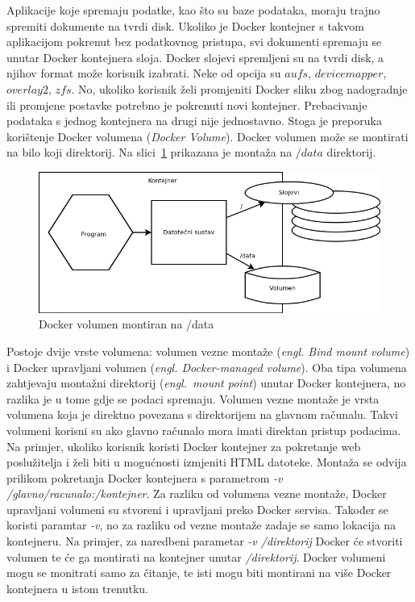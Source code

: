 Aplikacije koje spremaju podatke, kao što su baze podataka, moraju trajno spremiti dokumente na
tvrdi disk. Ukoliko je Docker kontejner s takvom aplikacijom pokrenut bez podatkovnog pristupa, svi
dokumenti spremaju se unutar Docker kontejnera sloja. Docker slojevi spremljeni su na tvrdi disk,
a njihov format može korisnik izabrati. Neke od opcija su $aufs$, $devicemapper$, $overlay2$, $zfs$.
No, ukoliko korisnik želi promjeniti Docker sliku zbog nadogradnje ili promjene postavke potrebno je
pokrenuti novi kontejner. Prebacivanje podataka s jednog kontejnera na drugi nije jednostavno. Stoga
je preporuka korištenje Docker volumena (\textit{Docker Volume}). Docker volumen može se montirati
na bilo koji direktorij. Na slici~\ref{fig:02docker_volume} prikazana je montaža na $/data$
direktorij.

\begin{figure}[h]
    \centering
    \includegraphics[width=\textwidth]{img/02/docker_volume.png}
    \caption{Docker volumen montiran na /data}%
    \label{fig:02docker_volume}
\end{figure}

Postoje dvije vrste volumena: volumen vezne montaže (\textit{engl. Bind mount volume}) i Docker
upravljani volumen (\textit{engl. Docker-managed volume}). Oba tipa volumena zahtjevaju montažni
direktorij (\textit{engl.~mount point}) unutar Docker kontejnera, no razlika je u tome gdje se
podaci spremaju. Volumen vezne montaže je vrsta volumena koja je direktno povezana s direktorijem na
glavnom računalu. Takvi volumeni korisni su ako glavno računalo mora imati direktan pristup
podacima. Na primjer, ukoliko korisnik koristi Docker kontejner za pokretanje web poslužitelja i
želi biti u mogućnosti izmjeniti HTML datoteke. Montaža se odvija prilikom pokretanja Docker
kontejnera s parametrom \textit{-v /glavno/racunalo:/kontejner}. Za razliku od volumena vezne
montaže, Docker upravljani volumeni su stvoreni i upravljani preko Docker servisa. Također se
koristi paramtar \textit{-v}, no za razliku od vezne montaže zadaje se samo lokacija na kontejneru.
Na primjer, za naredbeni parametar \textit{-v /direktorij} Docker će stvoriti volumen te će ga
montirati na kontejner unutar \textit{/direktorij}. Docker volumeni mogu se monitrati samo za
čitanje, te isti mogu biti montirani na više Docker kontejnera u istom trenutku.

